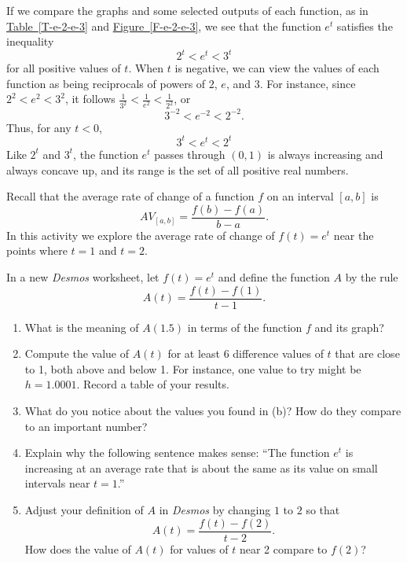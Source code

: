 \documentclass[nooutcomes]{ximera}
\begin{document}
If we compare the graphs and some selected outputs of each function, as in \hyperref[T-e-2-e-3]{Table~\ref{T-e-2-e-3}} and \hyperref[F-e-2-e-3]{Figure~\ref{F-e-2-e-3}}, we see that the function $e^t$ satisfies the inequality%
\begin{equation*}
2^t \lt e^t \lt 3^t
\end{equation*}
for all positive values of $t$.  When $t$ is negative, we can view the values of each function as being reciprocals of powers of $2$, $e$, and $3$.  For instance, since $2^2 \lt e^2 \lt 3^2$, it follows $\frac{1}{3^2} \lt \frac{1}{e^2} \lt \frac{1}{2^2}$, or%
\begin{equation*}
3^{-2} \lt e^{-2} \lt 2^{-2}\text{.}
\end{equation*}
Thus, for any $t \lt 0$,%
\begin{equation*}
3^t \lt e^t \lt 2^t
\end{equation*}
Like $2^t$ and $3^t$, the function $e^t$ passes through $(0,1)$ is always increasing and always concave up, and its range is the set of all positive real numbers.


\begin{exploration}
Recall that the average rate of change of a function $f$ on an interval $[a,b]$ is%
\begin{equation*}
AV_{[a,b]} = \frac{f(b)-f(a)}{b-a}\text{.}
\end{equation*}
In this activity we explore the average rate of change of $f(t) = e^t$ near the points where $t = 1$ and $t = 2$.%
\par
\hypertarget{p-1392}{}%
In a new \emph{Desmos} worksheet, let $f(t) = e^t$ and define the function $A$ by the rule%
\begin{equation*}
A(t) = \frac{f(t)-f(1)}{t-1}\text{.}
\end{equation*}
\begin{enumerate}[label=\alph*.]
\item What is the meaning of $A(1.5)$ in terms of the function $f$ and its graph?%
\item Compute the value of $A(t)$ for at least $6$ difference values of $t$ that are close to 1, both above and below 1.  For instance, one value to try might be $h = 1.0001$.  Record a table of your results.%
\item\hypertarget{li-634}{}\hypertarget{p-1396}{}%
What do you notice about the values you found in (b)?  How do they compare to an important number?%
\item\hypertarget{li-635}{}\hypertarget{p-1397}{}%
Explain why the following sentence makes sense: ``The function $e^t$ is increasing at an average rate that is about the same as its value on small intervals near $t = 1$.''%
\item\hypertarget{li-636}{}\hypertarget{p-1398}{}%
Adjust your definition of $A$ in \emph{Desmos} by changing $1$ to $2$ so that%
\begin{equation*}
A(t) = \frac{f(t)-f(2)}{t-2}\text{.}
\end{equation*}
How does the value of $A(t)$ for values of $t$ near 2 compare to $f(2)$?%
\end{enumerate}

\end{exploration}
\end{document}
